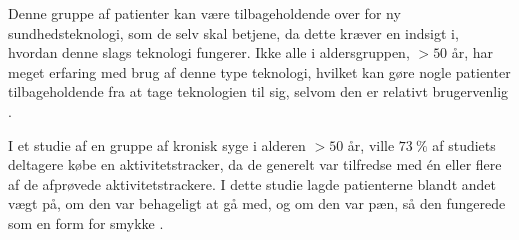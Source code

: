 Denne gruppe af patienter kan være tilbageholdende over for ny sundhedsteknologi, som de selv skal betjene, da dette kræver en indsigt i, hvordan denne slags teknologi fungerer. Ikke alle i aldersgruppen, $>50$ år, har meget erfaring med brug af denne type teknologi, hvilket kan gøre nogle patienter tilbageholdende fra at tage teknologien til sig, selvom den er relativt brugervenlig \citep{mercer2016}. 

I et studie af en gruppe af kronisk syge i alderen $>50$ år, ville $73~\%$ af studiets deltagere købe en aktivitetstracker, da de generelt var tilfredse med én eller flere af de afprøvede aktivitetstrackere. I dette studie lagde patienterne blandt andet vægt på, om den var behageligt at gå med, og om den var pæn, så den fungerede som en form for smykke \citep{mercer2016}.